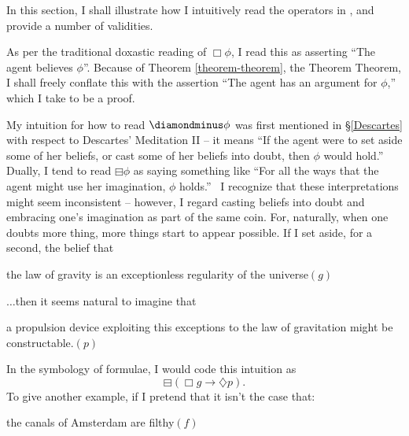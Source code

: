 % 

% 
\label{evil-intuition}
In this section, I shall illustrate how I intuitively read the operators in
, and provide a number of validities.

As per the traditional doxastic reading of $\Box  \phi$, I read this as
asserting ``The  agent believes $\phi$''.  Because of Theorem
\ref{theorem-theorem}, the Theorem Theorem, I shall freely conflate this with the assertion
``The  agent has an argument for $\phi$,'' which I take to be a
proof.

My intuition for how to read $\DM \phi$ was first mentioned in
\S\ref{Descartes} with respect to Descartes' Meditation II -- it means ``If the
 agent were to set aside some of her beliefs, or cast some of
her beliefs into doubt, then $\phi$ would hold.''  Dually, I tend to read
$\boxminus \phi$ as saying something like ``For all the ways that the
 agent might use her imagination, $\phi$ holds.'' \ I recognize
that these interpretations might seem inconsistent -- however, I regard
casting beliefs into doubt and embracing one's imagination as part of the same
coin.  For, naturally, when one doubts more thing, more things start to
appear possible.  If I set aside, for a second, the belief that

{\hspace*{\fill}}the law of gravity is an exceptionless regularity of the
universe{\hspace*{\fill}}$(g)$

$\ldots$then it seems natural to imagine that

{\hspace*{\fill}}a propulsion device exploiting this exceptions to the law of
gravitation might be constructable.{\hspace*{\fill}}$(p)$

In the symbology of  formulae, I would code this intuition as
\[ \boxminus (\Box  g \rightarrow \diamondsuit p) . \]
To give another example, if I pretend that it isn't the case that:

{\hspace*{\fill}}the canals of Amsterdam are filthy{\hspace*{\fill}}$(f)$

